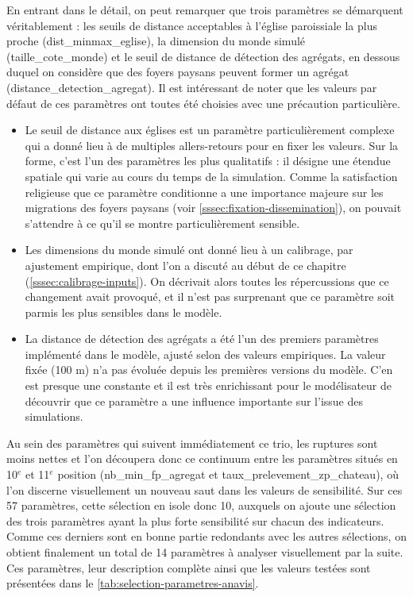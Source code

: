 En entrant dans le détail, on peut remarquer que trois paramètres se démarquent véritablement : les seuils de distance acceptables à l'église paroissiale la plus proche (\textsf{dist\_minmax\_eglise}), la dimension du monde simulé (\textsf{taille\_cote\_monde}) et le seuil de distance de détection des agrégats, en dessous duquel on considère que des foyers paysans peuvent former un agrégat (\textsf{distance\_detection\_agregat}).
Il est intéressant de noter que les valeurs par défaut de ces paramètres ont toutes été choisies avec une précaution particulière.
\begin{itemize}
	\item Le seuil de distance aux églises est un paramètre particulièrement complexe qui a donné lieu à de multiples allers-retours pour en fixer les valeurs.
	Sur la forme, c'est l'un des paramètres les plus \og qualitatifs\fg{} : il désigne une étendue spatiale qui varie au cours du temps de la simulation.
	Comme la satisfaction religieuse que ce paramètre conditionne a une importance majeure sur les migrations des foyers paysans (voir \cref{sssec:fixation-dissemination}), on pouvait s'attendre à ce qu'il se montre particulièrement sensible.
	\item Les dimensions du monde simulé ont donné lieu à un calibrage, par ajustement empirique, dont l'on a discuté au début de ce chapitre (\cref{sssec:calibrage-inputs}).
	On décrivait alors toutes les répercussions que ce changement avait provoqué, et il n'est pas surprenant que ce paramètre soit parmis les plus sensibles dans le modèle.
	\item La distance de détection des agrégats a été l'un des premiers paramètres implémenté dans le modèle, ajusté selon des valeurs empiriques.
	La valeur fixée (100 m) n'a pas évoluée depuis les premières versions du modèle.
	C'en est presque une constante et il est très enrichissant pour le modélisateur de découvrir que ce paramètre a une influence importante sur l'issue des simulations.
\end{itemize}

Au sein des paramètres qui suivent immédiatement ce trio, les ruptures sont moins nettes et l'on découpera donc ce continuum entre les paramètres situés en 10$^e$ et 11$^e$ position (\textsf{nb\_min\_fp\_agregat} et \textsf{taux\_prelevement\_zp\_chateau}), où l'on discerne visuellement un nouveau saut dans les valeurs de sensibilité.
Sur ces 57 paramètres, cette sélection en isole donc 10, auxquels on ajoute une sélection des trois paramètres ayant la plus forte sensibilité sur chacun des indicateurs.
Comme ces derniers sont en bonne partie redondants avec les autres sélections, on obtient finalement un total de 14 paramètres à analyser visuellement par la suite.
Ces paramètres, leur description complète ainsi que les valeurs testées sont présentées dans le \cref{tab:selection-parametres-anavis}.

